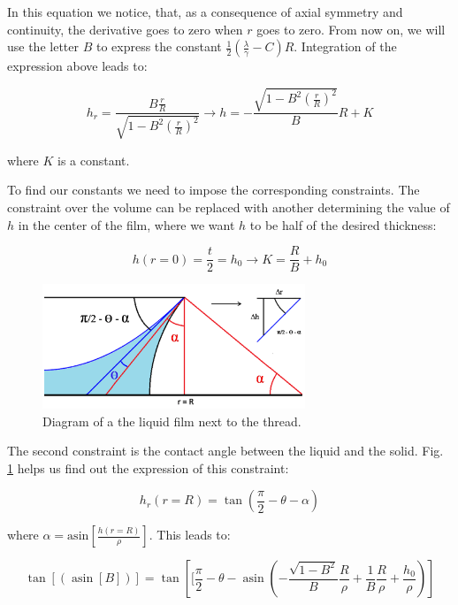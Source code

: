 In this equation we notice, that, as a consequence of axial symmetry and continuity, the derivative goes to zero when $r$ goes to zero. From now on, we will use the letter $B$ to express the constant $\frac{1}{2}\left(\frac{\lambda}{\gamma}-C\right) R$. Integration of the expression above leads to:

\begin{equation}
h_r=\frac{B \frac{r}{R}}{\sqrt{1-B^{2} \left(\frac{r}{R}\right)^2}} \rightarrow h=-\frac{\sqrt{1-B^{2} \left(\frac{r}{R}\right)^2}}{B} R + K
\end{equation}

where $K$ is a constant.

To find our constants we need to impose the corresponding constraints. The constraint over the volume can be replaced with another determining the value of $h$ in the center of the film, where we want $h$ to be half of the desired thickness:

\begin{equation}
h(r=0) = \frac{t}{2} = h_0 \rightarrow K = \frac{R}{B} + h_0
\end{equation}

\begin{figure}[H]
	\centering
	\includegraphics[width=0.7\textwidth]{archivos/geom_film.png}
	\caption{Diagram of a the liquid film next to the thread.}
	\label{geom_film}
\end{figure}

The second constraint is the contact angle between the liquid and the solid. Fig. \ref{geom_film} helps us find out the expression of this constraint:

\begin{equation}
h_r(r=R)=\tan \left(\frac{\pi}{2}-\theta-\alpha\right) 
\end{equation}

where $\alpha=\textrm{asin} \left[\frac{h(r=R)}{\rho}\right]$. This leads to:

\begin{equation}
\tan[(\operatorname{asin}[B])] = \tan \left[[\frac{\pi}{2}-\theta-\operatorname{asin}\left(-\frac{\sqrt{1-B^{2}}}{B} \frac{R}{\rho}+\frac{1}{B}\frac{R}{\rho}+\frac{h_0}{\rho}\right)\right]
\end{equation}

